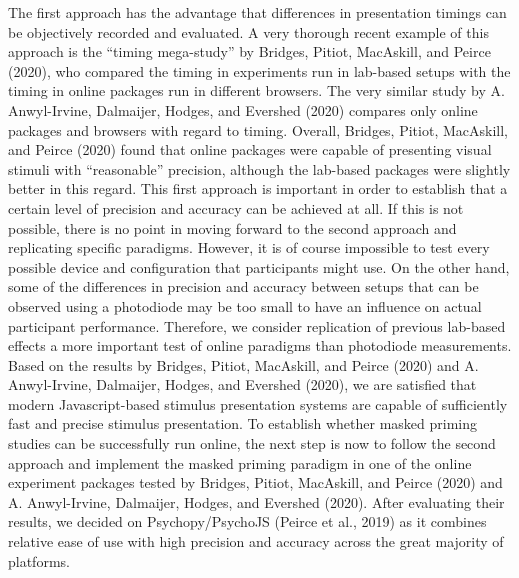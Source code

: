 \documentclass[
  english,
  man]{apa6}
\begin{document}
The first approach has the advantage that differences in presentation timings can be objectively recorded and evaluated. A very thorough recent example of this approach is the ``timing mega-study'' by Bridges, Pitiot, MacAskill, and Peirce (2020), who compared the timing in experiments run in lab-based setups with the timing in online packages run in different browsers. The very similar study by A. Anwyl-Irvine, Dalmaijer, Hodges, and Evershed (2020) compares only online packages and browsers with regard to timing. Overall, Bridges, Pitiot, MacAskill, and Peirce (2020) found that online packages were capable of presenting visual stimuli with ``reasonable'' precision, although the lab-based packages were slightly better in this regard. This first approach is important in order to establish that a certain level of precision and accuracy can be achieved at all. If this is not possible, there is no point in moving forward to the second approach and replicating specific paradigms. However, it is of course impossible to test every possible device and configuration that participants might use. On the other hand, some of the differences in precision and accuracy between setups that can be observed using a photodiode may be too small to have an influence on actual participant performance. Therefore, we consider replication of previous lab-based effects a more important test of online paradigms than photodiode measurements. Based on the results by Bridges, Pitiot, MacAskill, and Peirce (2020) and A. Anwyl-Irvine, Dalmaijer, Hodges, and Evershed (2020), we are satisfied that modern Javascript-based stimulus presentation systems are capable of sufficiently fast and precise stimulus presentation. To establish whether masked priming studies can be successfully run online, the next step is now to follow the second approach and implement the masked priming paradigm in one of the online experiment packages tested by Bridges, Pitiot, MacAskill, and Peirce (2020) and A. Anwyl-Irvine, Dalmaijer, Hodges, and Evershed (2020). After evaluating their results, we decided on Psychopy/PsychoJS (Peirce et al., 2019) as it combines relative ease of use with high precision and accuracy across the great majority of platforms.
\end{document}
